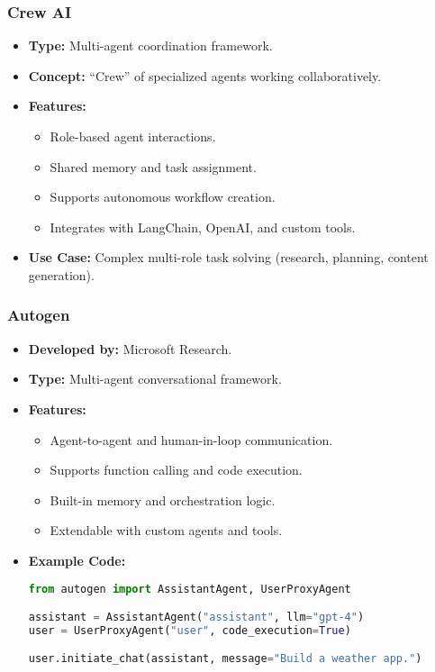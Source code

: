 \begin{frame}[fragile]\frametitle{Crew AI}
    \begin{itemize}
        \item \textbf{Type:} Multi-agent coordination framework.
        \item \textbf{Concept:} “Crew” of specialized agents working collaboratively.
        \item \textbf{Features:}
              \begin{itemize}
                  \item Role-based agent interactions.
                  \item Shared memory and task assignment.
                  \item Supports autonomous workflow creation.
                  \item Integrates with LangChain, OpenAI, and custom tools.
              \end{itemize}
        \item \textbf{Use Case:} Complex multi-role task solving (research, planning, content generation).
    \end{itemize}
\end{frame}

\begin{frame}[fragile]\frametitle{Autogen}
    \begin{itemize}
        \item \textbf{Developed by:} Microsoft Research.
        \item \textbf{Type:} Multi-agent conversational framework.
        \item \textbf{Features:}
              \begin{itemize}
                  \item Agent-to-agent and human-in-loop communication.
                  \item Supports function calling and code execution.
                  \item Built-in memory and orchestration logic.
                  \item Extendable with custom agents and tools.
              \end{itemize}
        \item \textbf{Example Code:}
\begin{lstlisting}[language=Python]
from autogen import AssistantAgent, UserProxyAgent

assistant = AssistantAgent("assistant", llm="gpt-4")
user = UserProxyAgent("user", code_execution=True)

user.initiate_chat(assistant, message="Build a weather app.")
\end{lstlisting}
    \end{itemize}
\end{frame}

